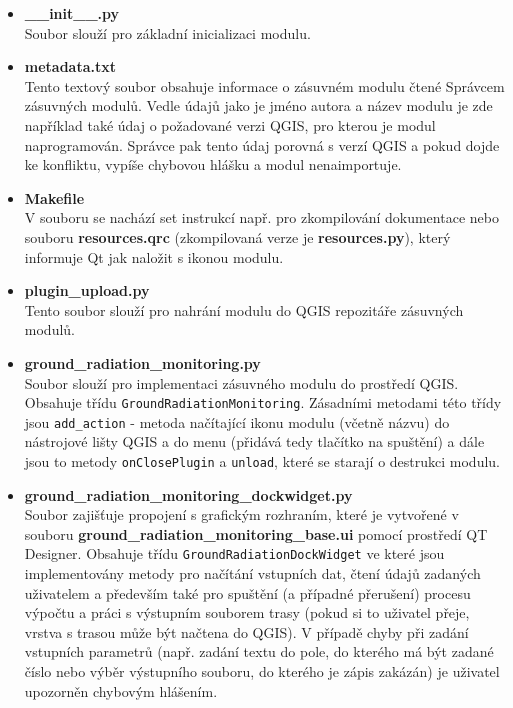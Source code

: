 \begin{itemize} 
	\item \textbf{\_\_init\_\_.py} \\ 
		Soubor slouží pro základní inicializaci modulu.
		 
	\item \textbf{metadata.txt} \\
		Tento textový soubor obsahuje informace o zásuvném modulu čtené Správcem zásuvných modulů. Vedle údajů jako je jméno autora a název modulu je zde například také údaj o požadované verzi QGIS, pro kterou je modul naprogramován. Správce pak tento údaj porovná s verzí QGIS a pokud dojde ke konfliktu, vypíše chybovou hlášku a modul nenaimportuje.
	
	\item \textbf{Makefile} \\
		V souboru se nachází set instrukcí např. pro zkompilování dokumentace nebo souboru \textbf{resources.qrc} (zkompilovaná verze je \textbf{resources.py}), který informuje Qt jak naložit s ikonou modulu.
		
	\item \textbf{plugin\_upload.py} \\
		Tento soubor slouží pro nahrání modulu do QGIS repozitáře zásuvných modulů.

	\item \textbf{ground\_radiation\_monitoring.py} \\
		Soubor slouží pro implementaci zásuvného modulu do prostředí QGIS. Obsahuje třídu \texttt{GroundRadiationMonitoring}. Zásadními metodami této třídy jsou \texttt{add\_action} - metoda načítající ikonu modulu (včetně názvu) do nástrojové lišty QGIS a do menu (přidává tedy tlačítko na spuštění) a dále jsou to metody \texttt{onClosePlugin} a \texttt{unload}, které se starají o destrukci modulu.

	\item \textbf{ground\_radiation\_monitoring\_dockwidget.py} \\
		Soubor zajišťuje propojení s grafickým rozhraním, které je vytvořené v souboru \textbf{ground\_radiation\_monitoring\_base.ui} pomocí prostředí QT Designer. Obsahuje třídu \texttt{GroundRadiationDockWidget} ve které jsou implementovány metody pro načítání vstupních dat, čtení údajů zadaných uživatelem a především také pro spuštění (a případné přerušení) procesu výpočtu a práci s výstupním souborem trasy (pokud si to uživatel přeje, vrstva s trasou může být načtena do QGIS). V případě chyby při zadání vstupních parametrů (např. zadání textu do pole, do kterého má být zadané číslo nebo výběr výstupního souboru, do kterého je zápis zakázán) je uživatel upozorněn chybovým hlášením.     
	

\end{itemize}
